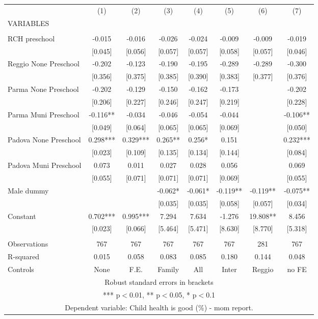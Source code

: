 \begin{tabular}{lccccccc} \hline
 & (1) & (2) & (3) & (4) & (5) & (6) & (7) \\
VARIABLES &  &  &  &  &  &  &  \\ \hline
 &  &  &  &  &  &  &  \\
RCH preschool & -0.015 & -0.016 & -0.026 & -0.024 & -0.009 & -0.009 & -0.019 \\
 & [0.045] & [0.056] & [0.057] & [0.057] & [0.058] & [0.057] & [0.046] \\
Reggio None Preschool & -0.202 & -0.123 & -0.190 & -0.195 & -0.289 & -0.289 & -0.300 \\
 & [0.356] & [0.375] & [0.385] & [0.390] & [0.383] & [0.377] & [0.376] \\
Parma None Preschool & -0.202 & -0.129 & -0.150 & -0.162 & -0.173 &  & -0.202 \\
 & [0.206] & [0.227] & [0.246] & [0.247] & [0.219] &  & [0.228] \\
Parma Muni Preschool & -0.116** & -0.034 & -0.046 & -0.054 & -0.044 &  & -0.106** \\
 & [0.049] & [0.064] & [0.065] & [0.065] & [0.069] &  & [0.050] \\
Padova None Preschool & 0.298*** & 0.329*** & 0.265** & 0.256* & 0.151 &  & 0.232*** \\
 & [0.023] & [0.109] & [0.135] & [0.134] & [0.144] &  & [0.084] \\
Padova Muni Preschool & 0.073 & 0.011 & 0.027 & 0.028 & 0.056 &  & 0.069 \\
 & [0.055] & [0.071] & [0.071] & [0.071] & [0.069] &  & [0.055] \\
Male dummy &  &  & -0.062* & -0.061* & -0.119** & -0.119** & -0.075** \\
 &  &  & [0.035] & [0.035] & [0.058] & [0.057] & [0.034] \\
Constant & 0.702*** & 0.995*** & 7.294 & 7.634 & -1.276 & 19.808** & 8.456 \\
 & [0.023] & [0.066] & [5.464] & [5.471] & [8.630] & [8.770] & [5.318] \\
 &  &  &  &  &  &  &  \\
Observations & 767 & 767 & 767 & 767 & 767 & 281 & 767 \\
R-squared & 0.015 & 0.058 & 0.083 & 0.085 & 0.180 & 0.144 & 0.048 \\
 Controls & None & F.E. & Family & All & Inter & Reggio & no FE \\ \hline
\multicolumn{8}{c}{ Robust standard errors in brackets} \\
\multicolumn{8}{c}{ *** p$<$0.01, ** p$<$0.05, * p$<$0.1} \\
\multicolumn{8}{c}{ Dependent variable: Child health is good (\%) - mom report.} \\
\end{tabular}
